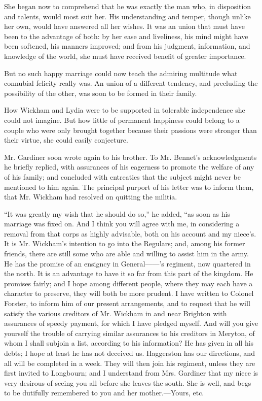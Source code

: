 \documentclass[12pt,openright]{book}
\begin{document}
She began now to comprehend that he was exactly the man who, in disposition and talents, would most suit her. His understanding and temper, though unlike her own, would have answered all her wishes. It was an union that must have been to the advantage of both: by her ease and liveliness, his mind might have been softened, his manners improved; and from his judgment, information, and knowledge of the world, she must have received benefit of greater importance.

But no such happy marriage could now teach the admiring multitude what connubial felicity really was. An union of a different tendency, and precluding the possibility of the other, was soon to be formed in their family.

How Wickham and Lydia were to be supported in tolerable independence she could not imagine. But how little of permanent happiness could belong to a couple who were only brought together because their passions were stronger than their virtue, she could easily conjecture.

Mr. Gardiner soon wrote again to his brother. To Mr. Bennet’s acknowledgments he briefly replied, with assurances of his eagerness to promote the welfare of any of his family; and concluded with entreaties that the subject might never be mentioned to him again. The principal purport of his letter was to inform them, that Mr. Wickham had resolved on quitting the militia.

“It was greatly my wish that he should do so,” he added, “as soon as his marriage was fixed on. And I think you will agree with me, in considering a removal from that corps as highly advisable, both on his account and my niece’s. It is Mr. Wickham’s intention to go into the Regulars; and, among his former friends, there are still some who are able and willing to assist him in the army. He has the promise of an ensigncy in General——’s regiment, now quartered in the north. It is an advantage to have it so far from this part of the kingdom. He promises fairly; and I hope among different people, where they may each have a character to preserve, they will both be more prudent. I have written to Colonel Forster, to inform him of our present arrangements, and to request that he will satisfy the various creditors of Mr. Wickham in and near Brighton with assurances of speedy payment, for which I have pledged myself. And will you give yourself the trouble of carrying similar assurances to his creditors in Meryton, of whom I shall subjoin a list, according to his information? He has given in all his debts; I hope at least he has not deceived us. Haggerston has our directions, and all will be completed in a week. They will then join his regiment, unless they are first invited to Longbourn; and I understand from Mrs. Gardiner that my niece is very desirous of seeing you all before she leaves the south. She is well, and begs to be dutifully remembered to you and her mother.—Yours, etc.
\end{document}
